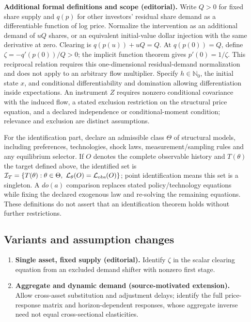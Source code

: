 \documentclass[11pt,a4paper]{article}
\begin{document}
\textbf{Additional formal definitions and scope (editorial).} Write \(Q>0\) for fixed share supply and \(q(p)\) for other investors' residual share demand as a differentiable function of log price. Normalize the intervention as an additional demand of \(uQ\) shares, or an equivalent initial-value dollar injection with the same derivative at zero. Clearing is \(q(p(u))+uQ=Q\). At \(q(p(0))=Q\), define \(\zeta=-q'(p(0))/Q>0\); the implicit function theorem gives \(p'(0)=1/\zeta\). This reciprocal relation requires this one-dimensional residual-demand normalization and does not apply to an arbitrary flow multiplier. Specify \(h\in\mathbb N_0\), the initial state \(x\), and conditional differentiability and domination allowing differentiation inside expectations. An instrument \(Z\) requires nonzero conditional covariance with the induced flow, a stated exclusion restriction on the structural price equation, and a declared independence or conditional-moment condition; relevance and exclusion are distinct assumptions.

For the identification part, declare an admissible class \(\Theta\) of structural models, including preferences, technologies, shock laws, measurement/sampling rules and any equilibrium selector. If \(O\) denotes the complete observable history and \(T(\theta)\) the target defined above, the identified set is \(\mathcal I_T=\{T(\theta):\theta\in\Theta,\ \mathcal L_\theta(O)=\mathcal L_{\rm obs}(O)\}\); point identification means this set is a singleton. A \(do(a)\) comparison replaces stated policy/technology equations while fixing the declared exogenous law and re-solving the remaining equations. These definitions do not assert that an identification theorem holds without further restrictions.
\subsection*{Variants and assumption changes}
\begin{enumerate}
\item \textbf{Single asset, fixed supply (editorial).} Identify \(\zeta\) in the scalar clearing equation from an excluded demand shifter with nonzero first stage.
\item \textbf{Aggregate and dynamic demand (source-motivated extension).} Allow cross-asset substitution and adjustment delays; identify the full price-response matrix and horizon-dependent responses, whose aggregate inverse need not equal cross-sectional elasticities.
\end{enumerate}
\end{document}
